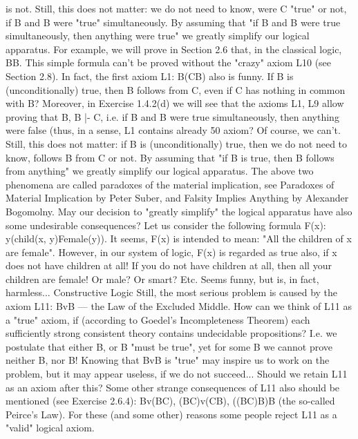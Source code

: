 is not. Still, this does not matter: we do not need to know, were C "true" or not, if \neg B and B were "true"
simultaneously. By assuming that "if \neg B and B were true simultaneously, then anything were true" we
greatly simplify our logical apparatus. For example, we will prove in Section 2.6 that, in the classical
logic, \neg \neg B\IMPLIES B. This simple formula can't be proved without the "crazy" axiom L10 (see Section 2.8).
In fact, the first axiom L1: B\IMPLIES (C\IMPLIES B) also is funny. If B is (unconditionally) true, then B follows from C,
even if C has nothing in common with B? Moreover, in Exercise 1.4.2(d) we will see that the axioms L1,
L9 allow proving that \neg B, B |- \neg C, i.e. if \neg B and B were true simultaneously, then anything were false
(thus, in a sense, L1 contains already 50%
axiom? Of course, we can't. Still, this does not matter: if B is (unconditionally) true, then we do not need
to know, follows B from C or not. By assuming that "if B is true, then B follows from anything" we
greatly simplify our logical apparatus.
The above two phenomena are called paradoxes of the material implication, see Paradoxes of Material
Implication by Peter Suber, and Falsity Implies Anything by Alexander Bogomolny.
May our decision to "greatly simplify" the logical apparatus have also some undesirable consequences?
Let us consider the following formula F(x): \forall y(child(x, y)\IMPLIES Female(y)). It seems, F(x) is intended to
mean: "All the children of x are female". However, in our system of logic, F(x) is regarded as true also, if
x does not have children at all! If you do not have children at all, then all your children are female! Or
male? Or smart? Etc. Seems funny, but is, in fact, harmless...
Constructive Logic
Still, the most serious problem is caused by the axiom L11: Bv\neg B --- the Law of the Excluded Middle.
How can we think of L11 as a "true" axiom, if (according to Goedel's Incompleteness Theorem) each
sufficiently strong consistent theory contains undecidable propositions? I.e. we postulate that either B, or
\neg B "must be true", yet for some B we cannot prove neither B, nor \neg B! Knowing that Bv\neg B is "true" may
inspire us to work on the problem, but it may appear useless, if we do not succeed... Should we retain L11
as an axiom after this?
Some other strange consequences of L11 also should be mentioned (see Exercise 2.6.4):
Bv(B\IMPLIES C),
(B\IMPLIES C)v(C\IMPLIES B),
((B\IMPLIES C)\IMPLIES B)\IMPLIES B (the so-called Peirce's Law).
For these (and some other) reasons some people reject L11 as a "valid" logical axiom.
